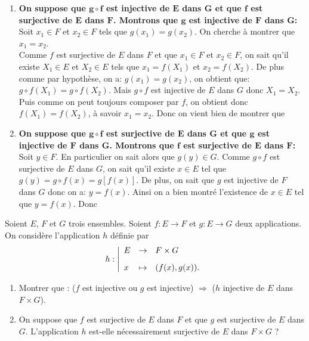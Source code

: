 \documentclass[a4paper, 11pt,reqno]{article}
\begin{document}
\begin{correction} \;
	\begin{enumerate}
		\item \textbf{On suppose que $\mathbf{g\circ f}$ est injective de $\mathbf{E}$ dans $\mathbf{G}$ et que $\mathbf{f}$ est surjective de $\mathbf{E}$ dans $\mathbf{F}$. Montrons que $\mathbf{g}$ est injective de $\mathbf{F}$ dans $\mathbf{G}$:}\\
		      \noindent Soit $x_1\in F$ et $x_2\in F$ tels que $g(x_1)=g(x_2)$. On cherche \`{a} montrer que $x_1=x_2$.\\
		      \noindent Comme $f$ est surjective de $E$ dans $F$ et que $x_1\in F$ et $x_2\in F$, on sait qu'il existe $X_1\in E$ et $X_2\in E$ tels que $x_1=f(X_1)$ et $x_2=f(X_2)$. De plus comme par hypoth\`{e}se, on a: $g(x_1)=g(x_2)$, on obtient que: $g\circ f(X_1)=g\circ f(X_2)$. Mais $g\circ f$ est injective de $E$ dans $G$ donc $X_1=X_2$. Puis comme on peut toujours composer par $f$, on obtient donc  $f(X_1)=f(X_2)$, \`{a} savoir $x_1=x_2$. Donc on vient bien de montrer que 
		\item \textbf{On suppose que $\mathbf{g\circ f}$ est surjective de $\mathbf{E}$ dans $\mathbf{G}$ et que $\mathbf{g}$ est injective de $\mathbf{F}$ dans $\mathbf{G}$. Montrons que $\mathbf{f}$ est surjective de $\mathbf{E}$ dans $\mathbf{F}$:}\\
		      \noindent Soit $y\in F$. En particulier on sait alors que $g(y)\in G$. Comme $g\circ f$ est surjective de $E$ dans $G$, on sait qu'il existe $x\in E$ tel que $g(y)=g\circ f(x)=g\left\lbrack f(x)\right\rbrack$. De plus, on sait que $g$ est injective de $F$ dans $G$ donc on a: $y=f(x)$. Ainsi on a bien montr\'e l'existence de $x\in E$ tel que $y=f(x)$. Donc 
	\end{enumerate}
\end{correction}
\begin{exercice}   \;
	Soient $E$, $F$ et $G$ trois ensembles. Soient $f: E\rightarrow F$ et $g: E\rightarrow G$ deux applications. On consid\`{e}re l'application $h$ d\'efinie par
	$$h: \left| \begin{array}{lll}
			E & \rightarrow & F\times G\vsec \\
			x & \mapsto     & (f(x),g(x)).
		\end{array} \right.$$
	\begin{enumerate}
		\item Montrer que : ($f$ est injective ou $g$ est injective)  $\Rightarrow$  ($h$ injective de $E$ dans $F\times G$).
		\item On suppose que $f$ est surjective de $E$ dans $F$ et que $g$ est surjective de $E$ dans $G$. L'application $h$ est-elle n\'ecessairement surjective de $E$ dans $F\times G$ ?
	\end{enumerate}
\end{exercice}
\end{document}
